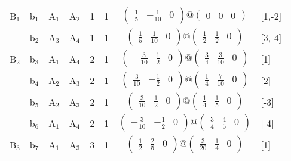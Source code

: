 \documentclass[fleqn,10pt,landscape]{article}
\begin{document}
\begin{itemize}
\begin{center}
\begin{longtable}{cc|cc|c|c|c|l}
B$_{1}$ & b$_{1}$ & A$_{1}$ & A$_{2}$ & 1 & 1 & $\begin{pmatrix} \frac{1}{5} & - \frac{1}{10} & 0 \end{pmatrix}@\begin{pmatrix} 0 & 0 & 0 \end{pmatrix}$ & [1,-2] \\
& b$_{2}$ & A$_{3}$ & A$_{4}$ & 1 & 1 & $\begin{pmatrix} \frac{1}{5} & \frac{1}{10} & 0 \end{pmatrix}@\begin{pmatrix} \frac{1}{2} & \frac{1}{2} & 0 \end{pmatrix}$ & [3,-4] \\ \hline
B$_{2}$ & b$_{3}$ & A$_{1}$ & A$_{4}$ & 2 & 1 & $\begin{pmatrix} - \frac{3}{10} & \frac{1}{2} & 0 \end{pmatrix}@\begin{pmatrix} \frac{3}{4} & \frac{3}{10} & 0 \end{pmatrix}$ & [1] \\
& b$_{4}$ & A$_{2}$ & A$_{3}$ & 2 & 1 & $\begin{pmatrix} \frac{3}{10} & - \frac{1}{2} & 0 \end{pmatrix}@\begin{pmatrix} \frac{1}{4} & \frac{7}{10} & 0 \end{pmatrix}$ & [2] \\
& b$_{5}$ & A$_{2}$ & A$_{3}$ & 2 & 1 & $\begin{pmatrix} \frac{3}{10} & \frac{1}{2} & 0 \end{pmatrix}@\begin{pmatrix} \frac{1}{4} & \frac{1}{5} & 0 \end{pmatrix}$ & [-3] \\
& b$_{6}$ & A$_{1}$ & A$_{4}$ & 2 & 1 & $\begin{pmatrix} - \frac{3}{10} & - \frac{1}{2} & 0 \end{pmatrix}@\begin{pmatrix} \frac{3}{4} & \frac{4}{5} & 0 \end{pmatrix}$ & [-4] \\ \hline
B$_{3}$ & b$_{7}$ & A$_{1}$ & A$_{3}$ & 3 & 1 & $\begin{pmatrix} \frac{1}{2} & \frac{2}{5} & 0 \end{pmatrix}@\begin{pmatrix} \frac{3}{20} & \frac{1}{4} & 0 \end{pmatrix}$ & [1] \\

\end{longtable}
\end{center}
\end{itemize}
\end{document}
